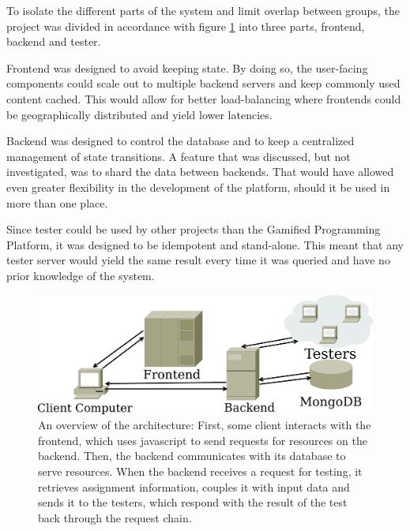 To isolate the different parts of the system and limit overlap between groups, the project was divided in accordance with figure \ref{fig:architecture} into three parts, frontend, backend and tester.

Frontend was designed to avoid keeping state. By doing so, the user-facing components could scale out to multiple backend servers and keep commonly used content cached. This would allow for better load-balancing where frontends could be geographically distributed and yield lower latencies.

Backend was designed to control the database and to keep a centralized management of state transitions. A feature that was discussed, but not investigated, was to shard the data between backends. That would have allowed even greater flexibility in the development of the platform, should it be used in more than one place.

Since tester could be used by other projects than the Gamified Programming Platform, it was designed to be idempotent and stand-alone. This meant that any tester server would yield the same result every time it was queried and have no prior knowledge of the system.
\begin{figure}
    \centering
    \includegraphics[width=.9\textwidth]{img/architecture.pdf}
    \caption{An overview of the architecture: First, some client interacts with the frontend, which uses javascript to send requests for resources on the backend. Then, the backend communicates with its database to serve resources. When the backend receives a request for testing, it retrieves assignment information, couples it with input data and sends it to the testers, which respond with the result of the test back through the request chain.}\label{fig:architecture}
\end{figure}
